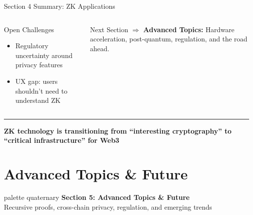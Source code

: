 \documentclass[8pt,aspectratio=169]{beamer}
\newcommand{\bottomnote}[1]{\vfill\vspace{-2mm}\textcolor{mllavender2}{\rule{\textwidth}{0.4pt}}\vspace{1mm}\footnotesize\textbf{#1}}
\begin{document}
\begin{frame}{Section 4 Summary: ZK Applications}
\begin{columns}[T]
\begin{alertblock}{\footnotesize Open Challenges}
\begin{itemize}
\item Regulatory uncertainty around privacy features
\item UX gap: users shouldn't need to understand ZK
\end{itemize}
\end{alertblock}
\vspace{0.1cm}
\begin{exampleblock}{\footnotesize Next Section}
\footnotesize
$\Rightarrow$ \textbf{Advanced Topics:} Hardware acceleration, post-quantum, regulation, and the road ahead.
\end{exampleblock}
\end{columns}
\bottomnote{ZK technology is transitioning from ``interesting cryptography'' to ``critical infrastructure'' for Web3}
\end{frame}

\section{Advanced Topics \& Future}

\begin{frame}{}
\begin{beamercolorbox}[sep=12pt,center,rounded=true,shadow=true]{palette quaternary}
{\Large\bfseries Section 5: Advanced Topics \& Future}\\[6pt]
{\normalsize Recursive proofs, cross-chain privacy, regulation, and emerging trends}
\end{beamercolorbox}
\end{frame}
\end{document}

